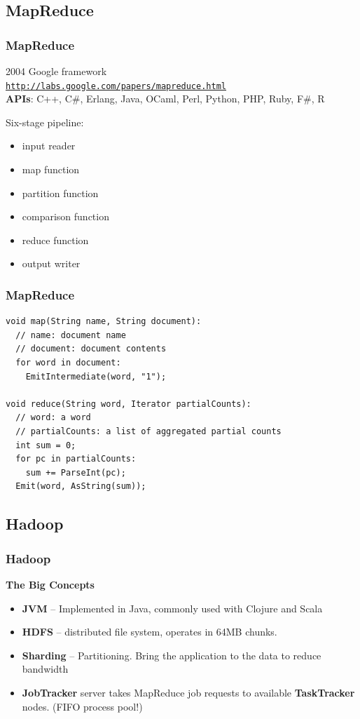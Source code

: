 \documentclass[t]{beamer}
\begin{document}
\subsection{MapReduce}
\begin{frame}
\frametitle{MapReduce}
2004 Google framework\\
\texttt{\url{http://labs.google.com/papers/mapreduce.html}}\\
\textbf{APIs}: C++, C\#, Erlang, Java, OCaml, Perl, Python, PHP, Ruby, F\#, R

\pause \bigskip

Six-stage pipeline:
\begin{itemize}
  \item input reader
  \item map function
  \item partition function
  \item comparison function
  \item reduce function
  \item output writer
\end{itemize}
\end{frame}

\begin{frame}[fragile]
\frametitle{MapReduce}
\begin{verbatim}
void map(String name, String document):
  // name: document name
  // document: document contents
  for word in document:
    EmitIntermediate(word, "1");
 
void reduce(String word, Iterator partialCounts):
  // word: a word
  // partialCounts: a list of aggregated partial counts
  int sum = 0;
  for pc in partialCounts:
    sum += ParseInt(pc);
  Emit(word, AsString(sum));
\end{verbatim}
\end{frame}


\subsection{Hadoop}
\begin{frame}
\frametitle{Hadoop}
\textbf{The Big Concepts}
\medskip
\begin{itemize}
  \item \textbf{JVM} -- Implemented in Java, commonly used with Clojure and Scala
  \pause
  \item \textbf{HDFS} -- distributed file system, operates in 64MB chunks.
  \pause
  \item \textbf{Sharding} -- Partitioning. Bring the application to the data to reduce bandwidth
  \pause
  \item \textbf{JobTracker} server takes MapReduce job requests to available \textbf{TaskTracker} nodes. (FIFO process pool!)
\end{itemize}
\end{frame}
\end{document}
